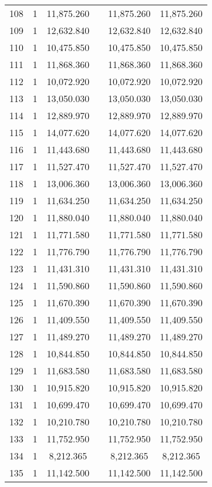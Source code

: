 \begin{table}[!htbp]
\begin{tabular}{@{\extracolsep{5pt}}lccccc}
108 & 1 & 11,875.260 &  & 11,875.260 & 11,875.260 \\ 
109 & 1 & 12,632.840 &  & 12,632.840 & 12,632.840 \\ 
110 & 1 & 10,475.850 &  & 10,475.850 & 10,475.850 \\ 
111 & 1 & 11,868.360 &  & 11,868.360 & 11,868.360 \\ 
112 & 1 & 10,072.920 &  & 10,072.920 & 10,072.920 \\ 
113 & 1 & 13,050.030 &  & 13,050.030 & 13,050.030 \\ 
114 & 1 & 12,889.970 &  & 12,889.970 & 12,889.970 \\ 
115 & 1 & 14,077.620 &  & 14,077.620 & 14,077.620 \\ 
116 & 1 & 11,443.680 &  & 11,443.680 & 11,443.680 \\ 
117 & 1 & 11,527.470 &  & 11,527.470 & 11,527.470 \\ 
118 & 1 & 13,006.360 &  & 13,006.360 & 13,006.360 \\ 
119 & 1 & 11,634.250 &  & 11,634.250 & 11,634.250 \\ 
120 & 1 & 11,880.040 &  & 11,880.040 & 11,880.040 \\ 
121 & 1 & 11,771.580 &  & 11,771.580 & 11,771.580 \\ 
122 & 1 & 11,776.790 &  & 11,776.790 & 11,776.790 \\ 
123 & 1 & 11,431.310 &  & 11,431.310 & 11,431.310 \\ 
124 & 1 & 11,590.860 &  & 11,590.860 & 11,590.860 \\ 
125 & 1 & 11,670.390 &  & 11,670.390 & 11,670.390 \\ 
126 & 1 & 11,409.550 &  & 11,409.550 & 11,409.550 \\ 
127 & 1 & 11,489.270 &  & 11,489.270 & 11,489.270 \\ 
128 & 1 & 10,844.850 &  & 10,844.850 & 10,844.850 \\ 
129 & 1 & 11,683.580 &  & 11,683.580 & 11,683.580 \\ 
130 & 1 & 10,915.820 &  & 10,915.820 & 10,915.820 \\ 
131 & 1 & 10,699.470 &  & 10,699.470 & 10,699.470 \\ 
132 & 1 & 10,210.780 &  & 10,210.780 & 10,210.780 \\ 
133 & 1 & 11,752.950 &  & 11,752.950 & 11,752.950 \\ 
134 & 1 & 8,212.365 &  & 8,212.365 & 8,212.365 \\ 
135 & 1 & 11,142.500 &  & 11,142.500 & 11,142.500 \\ 

\end{tabular}
\end{table}
